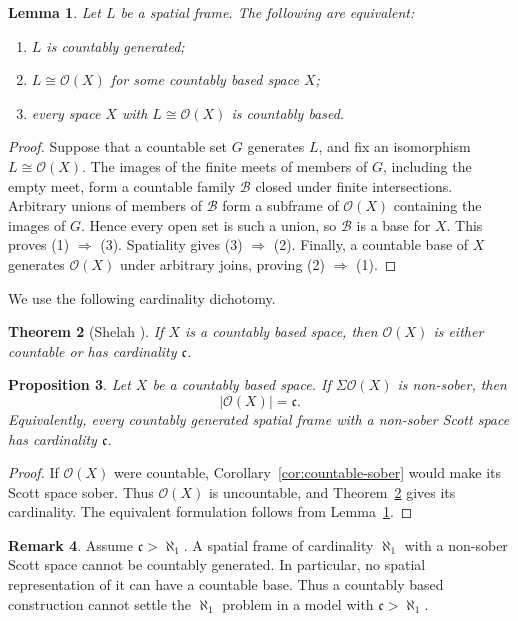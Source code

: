\documentclass[11pt,reqno]{amsart}
\newtheorem{theorem}{Theorem}[section]
\newtheorem{proposition}[theorem]{Proposition}
\newtheorem{lemma}[theorem]{Lemma}
\theoremstyle{definition}
\newtheorem{remark}[theorem]{Remark}
\numberwithin{equation}{section}
\newcommand{\OO}{\mathcal O}
\newcommand{\cc}{\mathfrak{c}}
\begin{document}
\begin{lemma}\label{lem:generated-based}
Let $L$ be a spatial frame. The following are equivalent:
\begin{enumerate}
\item $L$ is countably generated;
\item $L\cong\OO(X)$ for some countably based space $X$;
\item every space $X$ with $L\cong\OO(X)$ is countably based.
\end{enumerate}
\end{lemma}

\begin{proof}
Suppose that a countable set $G$ generates $L$, and fix an isomorphism
$L\cong\OO(X)$. The images of the finite meets of members of $G$, including
the empty meet, form a countable family $\mathcal B$ closed under finite
intersections. Arbitrary unions of members of $\mathcal B$ form a subframe
of $\OO(X)$ containing the images of $G$. Hence every open set is such a
union, so $\mathcal B$ is a base for $X$. This proves (1) $\Rightarrow$ (3).
Spatiality gives (3) $\Rightarrow$ (2). Finally, a countable base of $X$
generates $\OO(X)$ under arbitrary joins, proving (2) $\Rightarrow$ (1).
\end{proof}

We use the following cardinality dichotomy.

\begin{theorem}[Shelah {\citep[Theorem~1]{Shelah1993}}]
\label{thm:shelah}
If $X$ is a countably based space, then $\OO(X)$ is either countable or
has cardinality $\cc$.
\end{theorem}

\begin{proposition}\label{prop:countably-based-barrier}
Let $X$ be a countably based space. If $\Sigma\OO(X)$ is non-sober, then
\[
  |\OO(X)|=\cc.
\]
Equivalently, every countably generated spatial frame with a non-sober
Scott space has cardinality $\cc$.
\end{proposition}

\begin{proof}
If $\OO(X)$ were countable, Corollary~\ref{cor:countable-sober} would make
its Scott space sober. Thus $\OO(X)$ is uncountable, and
Theorem~\ref{thm:shelah} gives its cardinality. The equivalent formulation
follows from Lemma~\ref{lem:generated-based}.
\end{proof}

\begin{remark}\label{rem:barrier}
Assume $\cc>\aleph_1$. A spatial frame of cardinality $\aleph_1$ with a
non-sober Scott space cannot be countably generated. In particular, no
spatial representation of it can have a countable base. Thus a
countably based construction cannot settle the $\aleph_1$ problem in a
model with $\cc>\aleph_1$.
\end{remark}
\end{document}

